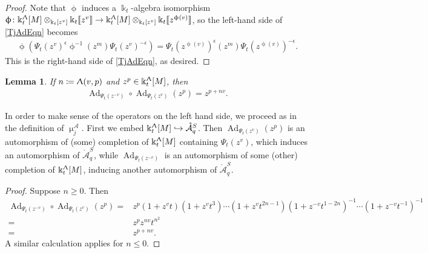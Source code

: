 \documentclass{amsart}
\DeclareMathOperator{\Ad}{Ad}
\let\llb=\llbracket
\let\rrb=\rrbracket
\let\rar=\rightarrow
\let\s=\mathcal
\let\mr=\mathring
\newcommand {\kk} {\Bbbk}
\newcommand {\kt} {\kk_t}
\renewcommand{\Lambda}{\Uplambda}
\renewcommand{\phi}{\upphi}
\renewcommand{\mu}{\upmu}
\theoremstyle{plain}%
\newtheorem{lem}[thm]{Lemma}
\theoremstyle{definition}
\theoremstyle{remark}
\begin{document}
\begin{proof}
Note that $\phi$ induces a $\kt$-algebra isomorphism $\phi\colon\kk_t^{\Lambda}[M]\otimes_{\kk_t[z^v]} \kk_t\llb z^v\rrb\rar \kk_t^{\Lambda}[M]\otimes_{\kk_t[z^v]} \kk_t\llb z^{\phi(v)}\rrb$, so the left-hand side of \eqref{TjAdEqn} becomes \begin{align*}
    \phi(\Psi_t(z^v)^{\epsilon} \phi^{-1}(z^m) \Psi_t(z^v)^{-\epsilon}) = \Psi_t(z^{\phi(v)})^{\epsilon} (z^m) \Psi_t(z^{\phi(v)})^{-\epsilon}.
\end{align*}
This is the right-hand side of \eqref{TjAdEqn}, as desired.
\end{proof}

\begin{lem}\label{AdAd}
If 
$n\coloneqq \Lambda(v,p)$ and $z^p\in \kk_t^{\Lambda}[M]$, then
\begin{align*}
   \Ad_{\Psi_t(z^{-v})} \circ \Ad_{\Psi_t(z^v)}(z^p)=z^{p+nv}.
\end{align*}
\end{lem}
In order to make sense of the operators on the left hand side, we proceed as in the definition of $\mu_j^{\s{A}}$.  First we embed $\kk_t^{\Lambda}[M]\hookrightarrow \mr{\s{A}}_q^S$.  Then $\Ad_{\Psi_t(z^v)}(z^p)$ is an automorphism of (some) completion of $\kk_t^{\Lambda}[M]$ containing $\Psi_t(z^v)$, which induces an automorphism of $\mr{\s{A}}_q^S$, while $\Ad_{\Psi_t(z^{-v})}$ is an automorphism of some (other) completion of $\kk_t^{\Lambda}[M]$, inducing another automorphism of $\mr{\s{A}}_q^S$.
\begin{proof}
Suppose $n\geq 0$.  Then 
\begin{align*}
   \Ad_{\Psi_t(z^{-v})} \circ \Ad_{\Psi_t(z^v)}(z^p)=&z^p(1+z^vt)(1+z^vt^3)\cdots (1+z^vt^{2n-1})(1+z^{-v}t^{1-2n})^{-1}\cdots (1+z^{-v}t^{-1})^{-1} \\
    =&z^p z^{nv}t^{n^2} \\
    =&z^{p+nv}.
\end{align*}
A similar calculation applies for $n\leq 0$.
\end{proof}
\end{document}
